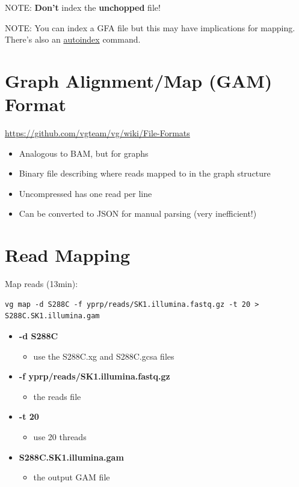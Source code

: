 \documentclass[
]{book}
\providecommand{\tightlist}{%
  \setlength{\itemsep}{0pt}\setlength{\parskip}{0pt}}
\begin{document}
NOTE: \textbf{Don't} index the \textbf{unchopped} file!

NOTE: You can index a GFA file but this may have implications for mapping.
There's also an \href{https://github.com/vgteam/vg/wiki/Automatic-indexing-for-read-mapping-and-downstream-inference}{autoindex} command.

\hypertarget{graph-alignmentmap-gam-format}{%
\section{Graph Alignment/Map (GAM) Format}\label{graph-alignmentmap-gam-format}}

\url{https://github.com/vgteam/vg/wiki/File-Formats}

\begin{itemize}
\tightlist
\item
  Analogous to BAM, but for graphs
\item
  Binary file describing where reads mapped to in the graph
  structure
\item
  Uncompressed has one read per line
\item
  Can be converted to JSON for manual parsing (very inefficient!)
\end{itemize}

\hypertarget{read-mapping}{%
\section{Read Mapping}\label{read-mapping}}

Map reads (13min):

\begin{verbatim}
vg map -d S288C -f yprp/reads/SK1.illumina.fastq.gz -t 20 > S288C.SK1.illumina.gam
\end{verbatim}

\begin{itemize}
\tightlist
\item
  \textbf{-d S288C}

  \begin{itemize}
  \tightlist
  \item
    use the S288C.xg and S288C.gcsa files
  \end{itemize}
\item
  \textbf{-f yprp/reads/SK1.illumina.fastq.gz}

  \begin{itemize}
  \tightlist
  \item
    the reads file
  \end{itemize}
\item
  \textbf{-t 20}

  \begin{itemize}
  \tightlist
  \item
    use 20 threads
  \end{itemize}
\item
  \textbf{S288C.SK1.illumina.gam}

  \begin{itemize}
  \tightlist
  \item
    the output GAM file
  \end{itemize}
\end{itemize}
\end{document}
